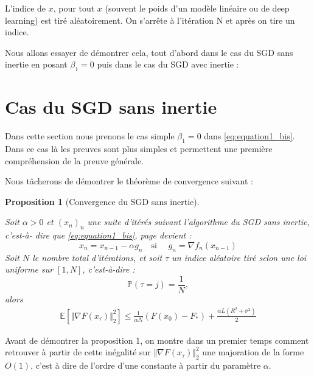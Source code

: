 \documentclass{article}
\newtheorem{prop}{Proposition}
\begin{document}
L'indice de $x$, pour tout $x$ (souvent le poids d'un modèle linéaire ou de deep learning) est tiré aléatoirement. On s'arrête à l'itération N et après on tire un indice.
\bigskip

Nous allons essayer de démontrer cela, tout d'abord dans le cas du SGD sans inertie en posant $\beta_1=0$ puis dans le cas du SGD avec inertie :

\bigskip

\section{Cas du SGD sans inertie}

Dans cette section nous prenons le cas simple $\beta_1=0$ dans \eqref{eq:equation1_bis}. %
Dans ce cas là les preuves sont plus simples et permettent une première compréhension de la preuve générale.

Nous tâcherons de démontrer le théorème de convergence suivant :

\begin{prop}[Convergence du SGD sans inertie]
\label{prop:conv_sans_inertie}

Soit $\alpha>0$ et $(x_n)_n$ une suite d'itérés suivant l'algorithme du SGD sans inertie, c'est-à- dire que \eqref{eq:equation1_bis}, page \pageref{eq:equation1_bis} devient :
\begin{equation}
    x_n=x_{n-1}-\alpha g_n  \quad \text{si  } \quad g_n= \nabla f_n(x_{n-1})
\end{equation}
Soit $N$ le nombre total d'itérations, et soit $\tau$ un indice aléatoire tiré selon une loi uniforme sur $[1,N]$, c'est-à-dire : $$\mathbb{P}(\tau = j) = \frac{1}{N}, $$
alors 
\begin{eqnarray*}
\mathbb{E}\left[ \Vert \nabla F(x_\tau) \Vert ^2_2\right] \leq \frac{1}{\alpha N} (F(x_0)-F_*) + \frac{\alpha L (R^2+ \sigma^2)}{2} 
\end{eqnarray*}
 \begin{equation}
    \label{eq:B6_simplifie}
\end{equation}
\end{prop}



\bigskip

Avant de démontrer la proposition 1, on montre dans un premier temps comment  retrouver à partir de cette inégalité sur $ \Vert \nabla F(x_\tau) \Vert ^2_2$ une majoration de la forme $O(1) $, c'est à dire de l'ordre d'une constante à partir du paramètre $\alpha$.
\end{document}
